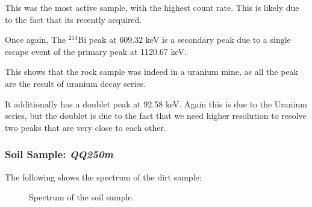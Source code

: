 \documentclass{article}
\begin{document}
This was the most active sample, with the highest count rate. This is likely due to the fact that its recently acquired.

Once again, The $^{214}$Bi peak at 609.32 keV is a secondary peak due to a single escape event of the primary peak at 1120.67 keV.

This shows that the rock sample was indeed in a uranium mine, as all the peak are the result of uranium decay series.

It additionally has a doublet peak at 92.58 keV. Again this is due to the Uranium series, but the doublet is due to the fact that we need higher resolution to resolve two peaks that are very close to each other.

\pagebreak{}

\subsubsection{Soil Sample: \textit{QQ250m}}

The following shows the spectrum of the dirt sample:

\begin{figure}[h!]
	\centering
	\scalebox{1}{}
	\caption{Spectrum of the soil sample.}
	\label{fig:Dirt}
\end{figure}
\end{document}
